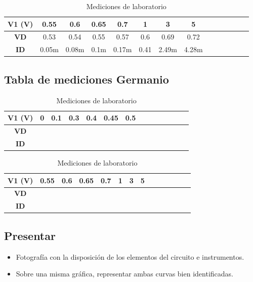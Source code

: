 \begin{table}[H]
\centering
\caption{Mediciones de laboratorio}
\begin{tabular}{|c|c|c|c|c|c|c|c|c|c|c|c|c|c|}
\hline
\textbf{V1 (V)} & 0.55 & 0.6 & 0.65 & 0.7 & 1 & 3 & 5\\
\hline
\textbf{VD} & 0.53 & 0.54 & 0.55 & 0.57 & 0.6 & 0.69 & 0.72\\
\hline
\textbf{ID} & 0.05m & 0.08m & 0.1m & 0.17m & 0.41 & 2.49m & 4.28m\\
\hline
\end{tabular}
\end{table}


\subsection*{Tabla de mediciones Germanio}

\begin{table}[H]
\centering
\caption{Mediciones de laboratorio}
\begin{tabular}{|c|c|c|c|c|c|c|c|c|c|c|c|c|c|}
\hline
\textbf{V1 (V)} & 0 & 0.1 & 0.3 & 0.4 & 0.45 & 0.5\\
\hline
\textbf{VD} &  &  &  &  &  &  \\
\hline
\textbf{ID} &  &  &  &  &  &  \\
\hline
\end{tabular}
\end{table}

\begin{table}[H]
\centering
\caption{Mediciones de laboratorio}
\begin{tabular}{|c|c|c|c|c|c|c|c|c|c|c|c|c|c|}
\hline
\textbf{V1 (V)} & 0.55 & 0.6 & 0.65 & 0.7 & 1 & 3 & 5\\
\hline
\textbf{VD} &  &  &  &  &  &  & \\
\hline
\textbf{ID} &  &  &  &  &  &  & \\
\hline
\end{tabular}
\end{table}



\subsection*{Presentar}

\begin{itemize}
    \item Fotografía con la disposición de los elementos del circuito e instrumentos.
    \item Sobre una misma gráfica, representar ambas curvas bien identificadas.
\end{itemize}

